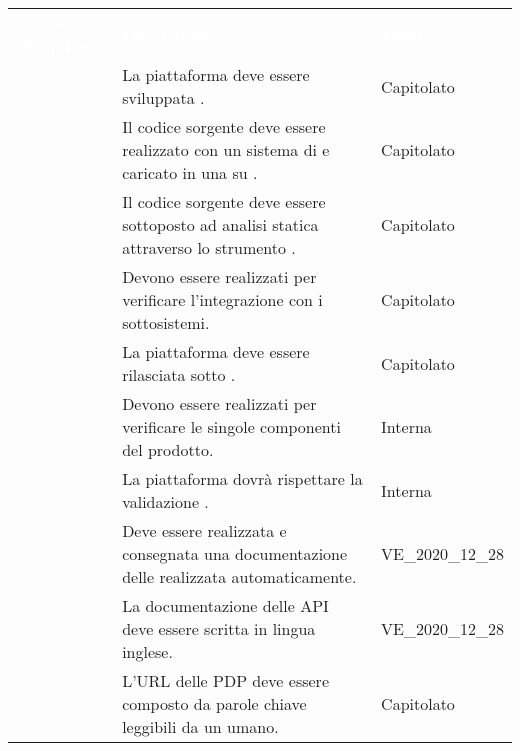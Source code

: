 \renewcommand{\arraystretch}{1.5}
\begin{longtable}{|c C{9.5cm} C{2.5cm}|} 
	
	\textcolor{white}{\textbf{Codice Requisito}}&
	\textcolor{white}{\textbf{Descrizione}}&
	\textcolor{white}{\textbf{Fonte}}\\
	 & La piattaforma deve essere sviluppata . & Capitolato \\
	
	 & Il codice sorgente deve essere realizzato con un sistema di  e caricato in una  su \textit{}. & Capitolato \\

	 & Il codice sorgente deve essere sottoposto ad analisi statica attraverso lo strumento . & Capitolato \\

	 & Devono essere realizzati  per verificare l'integrazione con i sottosistemi. & Capitolato \\

	 & La piattaforma deve essere rilasciata sotto . & Capitolato  \\

	 & Devono essere realizzati  per verificare le singole componenti del prodotto. & Interna  \\

	 & La piattaforma dovrà rispettare la validazione . & Interna \\
	
	 & Deve essere realizzata e consegnata una documentazione delle  realizzata automaticamente. & VE\_2020\_12\_28 \\
	
	 & La documentazione delle API deve essere scritta in lingua inglese. & VE\_2020\_12\_28 \\
	
	 & L'URL delle PDP deve essere composto da parole chiave leggibili da un umano. & Capitolato \\
\end{longtable}

